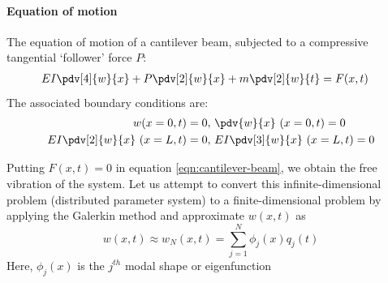 \paragraph{Equation of motion} The equation of motion of a cantilever beam, subjected to a compressive tangential `follower' force $P$:
\begin{align}
EI\pdv[4]{w}{x} + P\pdv[2]{w}{x} + m\pdv[2]{w}{t} &= F(x,t)  \label{eqn:cantilever-beam}
\end{align}
The associated boundary conditions are:
\begin{equation}
\begin{aligned}
w(x=0,t) = 0, &~ \pdv{w}{x}~(x=0,t) = 0 \\
EI\pdv[2]{w}{x}~(x=L,t) = 0, &  ~EI\pdv[3]{w}{x}~(x=L,t) = 0 
\end{aligned}
\label{eqn:bcs}
\end{equation}

Putting $F(x,t) = 0$ in equation \ref{eqn:cantilever-beam}, we obtain the free vibration of the system. 
Let us attempt to convert this infinite-dimensional problem (distributed parameter system) to a finite-dimensional problem by applying the Galerkin method and approximate $w (x,t)$ as
\begin{equation*}
w(x,t) \approx w_N (x,t) = \sum_{j=1}^N \phi_j (x) q_j(t)
\end{equation*}
Here, $\phi_j(x)$ is the $j^{th}$ modal shape or eigenfunction \\

